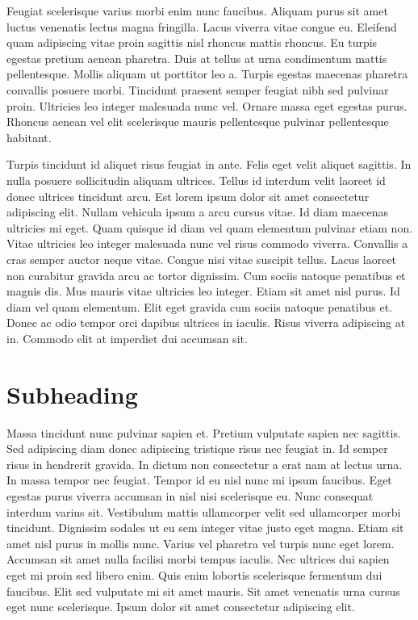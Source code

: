 Feugiat scelerisque varius morbi enim nunc faucibus. Aliquam purus sit amet luctus venenatis lectus magna fringilla. Lacus viverra vitae congue eu. Eleifend quam adipiscing vitae proin sagittis nisl rhoncus mattis rhoncus. Eu turpis egestas pretium aenean pharetra. Duis at tellus at urna condimentum mattis pellentesque. Mollis aliquam ut porttitor leo a. Turpis egestas maecenas pharetra convallis posuere morbi. Tincidunt praesent semper feugiat nibh sed pulvinar proin. Ultricies leo integer malesuada nunc vel. Ornare massa eget egestas purus. Rhoncus aenean vel elit scelerisque mauris pellentesque pulvinar pellentesque habitant.

Turpis tincidunt id aliquet risus feugiat in ante. Felis eget velit aliquet sagittis. In nulla posuere sollicitudin aliquam ultrices. Tellus id interdum velit laoreet id donec ultrices tincidunt arcu. Est lorem ipsum dolor sit amet consectetur adipiscing elit. Nullam vehicula ipsum a arcu cursus vitae. Id diam maecenas ultricies mi eget. Quam quisque id diam vel quam elementum pulvinar etiam non. Vitae ultricies leo integer malesuada nunc vel risus commodo viverra. Convallis a cras semper auctor neque vitae. Congue nisi vitae suscipit tellus. Lacus laoreet non curabitur gravida arcu ac tortor dignissim. Cum sociis natoque penatibus et magnis dis. Mus mauris vitae ultricies leo integer. Etiam sit amet nisl purus. Id diam vel quam elementum. Elit eget gravida cum sociis natoque penatibus et. Donec ac odio tempor orci dapibus ultrices in iaculis. Risus viverra adipiscing at in. Commodo elit at imperdiet dui accumsan sit.

\section*{Subheading}

Massa tincidunt nunc pulvinar sapien et. Pretium vulputate sapien nec sagittis. Sed adipiscing diam donec adipiscing tristique risus nec feugiat in. Id semper risus in hendrerit gravida. In dictum non consectetur a erat nam at lectus urna. In massa tempor nec feugiat. Tempor id eu nisl nunc mi ipsum faucibus. Eget egestas purus viverra accumsan in nisl nisi scelerisque eu. Nunc consequat interdum varius sit. Vestibulum mattis ullamcorper velit sed ullamcorper morbi tincidunt. Dignissim sodales ut eu sem integer vitae justo eget magna. Etiam sit amet nisl purus in mollis nunc. Varius vel pharetra vel turpis nunc eget lorem. Accumsan sit amet nulla facilisi morbi tempus iaculis. Nec ultrices dui sapien eget mi proin sed libero enim. Quis enim lobortis scelerisque fermentum dui faucibus. Elit sed vulputate mi sit amet mauris. Sit amet venenatis urna cursus eget nunc scelerisque. Ipsum dolor sit amet consectetur adipiscing elit.

